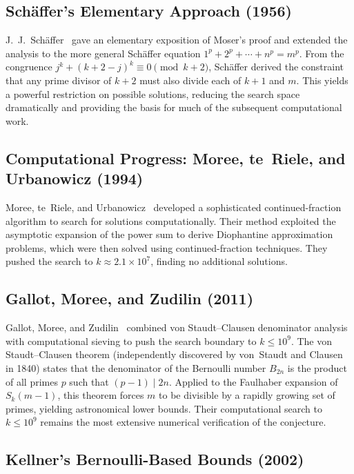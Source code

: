 \documentclass[12pt,a4paper]{article}
\theoremstyle{plain}
\theoremstyle{definition}
\begin{document}
\subsection{Sch\"{a}ffer's Elementary Approach (1956)}

J.~J.~Sch\"{a}ffer~\cite{Schaffer} gave an elementary exposition of
Moser's proof and extended the analysis to the more general Sch\"{a}ffer
equation $1^p + 2^p + \cdots + n^p = m^p$.  From the congruence
$j^k + (k+2-j)^k \equiv 0 \pmod{k+2}$, Sch\"{a}ffer derived the
constraint that any prime divisor of $k+2$ must also divide each of
$k+1$ and $m$.  This yields a powerful restriction on possible
solutions, reducing the search space dramatically and providing the
basis for much of the subsequent computational work.

\subsection{Computational Progress: Moree, te~Riele, and Urbanowicz (1994)}

Moree, te~Riele, and Urbanowicz~\cite{Moree} developed a sophisticated
continued-fraction algorithm to search for solutions computationally.
Their method exploited the asymptotic expansion of the power sum to
derive Diophantine approximation problems, which were then solved
using continued-fraction techniques.  They pushed the search to
$k \approx 2.1 \times 10^7$, finding no additional solutions.

\subsection{Gallot, Moree, and Zudilin (2011)}

Gallot, Moree, and Zudilin~\cite{Gallot} combined von Staudt--Clausen
denominator analysis with computational sieving to push the search
boundary to $k \le 10^9$.  The von Staudt--Clausen theorem
\cite{vonStaudt,Clausen} (independently discovered by von~Staudt and
Clausen in 1840) states that the denominator of the Bernoulli number
$B_{2n}$ is the product of all primes $p$ such that $(p-1) \mid 2n$.
Applied to the Faulhaber expansion of $S_k(m-1)$, this theorem forces
$m$ to be divisible by a rapidly growing set of primes, yielding
astronomical lower bounds.  Their computational search to $k \le 10^9$
remains the most extensive numerical verification of the conjecture.

\subsection{Kellner's Bernoulli-Based Bounds (2002)}
\end{document}
